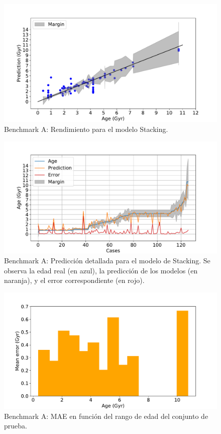 \begin{figure}[H]
\begin{center}
 \includegraphics[width=0.8\linewidth]{Figuras/Experimentos/B_A_stacking_1.pdf}
\end{center}
\caption{Benchmark A: Rendimiento para el modelo Stacking.}
 \label{fig:benchA_details_stacking_1}
\end{figure}

\begin{figure}[H]
\begin{center}
 \includegraphics[width=0.8\linewidth]{Figuras/Experimentos/B_A_stacking_2.pdf}
\end{center}
\caption{Benchmark A: Predicción detallada para el modelo de Stacking. Se observa la edad real (en azul), la predicción de los modelos (en naranja), y el error correspondiente (en rojo).}
 \label{fig:benchA_details_stacking_2}
\end{figure}

\begin{figure}[H]
\begin{center}
 \includegraphics[width=0.8\linewidth]{Figuras/Experimentos/B_A_stacking_3.pdf}
\end{center}
\caption{Benchmark A: MAE en función del rango de edad del conjunto de prueba.}
 \label{fig:benchA_details_stacking_3}
\end{figure}

